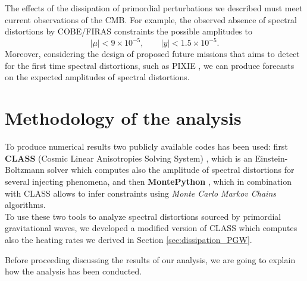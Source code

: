 The effects of the dissipation of primordial perturbations we described must meet current observations of the CMB. For example, the observed absence of spectral distortions by COBE/FIRAS \cite{COBE1996} constraints the possible amplitudes to 
\begin{equation}
    |\mu|<9\times10^{-5}, \qquad  |y|<1.5\times 10^{-5}.
\end{equation}
Moreover, considering the design of proposed future missions that aims to detect for the first time spectral distortions, such as PIXIE \cite{pixie}, we can produce forecasts on the expected amplitudes of spectral distortions.
\section{Methodology of the analysis}
To produce numerical results two publicly available codes has been used: first \textbf{CLASS} (Cosmic Linear Anisotropies Solving System) \cite{CLASS}, which is an Einstein-Boltzmann solver which computes also the amplitude of spectral distortions for several injecting phenomena, and then \textbf{MontePython} \cite{Brinckmann:2018cvx,Audren:2012wb}, which in combination with CLASS allows to infer constraints using \emph{Monte Carlo Markov Chains} algorithms.\\
To use these two tools to analyze spectral distortions sourced by primordial gravitational waves, we developed a modified version of CLASS which computes also the heating rates we derived in Section \ref{sec:dissipation_PGW}. 

Before proceeding discussing the results of our analysis, we are going to explain how the analysis has been conducted.

